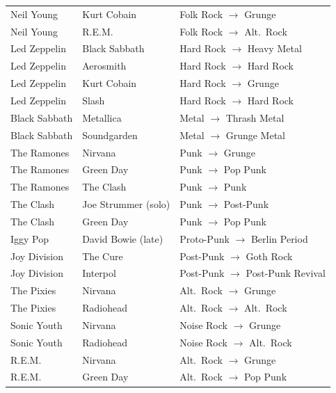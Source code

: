 \documentclass[12pt, a4paper]{article}
\begin{document}
\begin{longtable}{p{4.2cm} p{4.2cm} p{3cm}}
Neil Young          & Kurt Cobain            & Folk Rock $\to$ Grunge \\
Neil Young          & R.E.M.                 & Folk Rock $\to$ Alt.\ Rock \\
Led Zeppelin        & Black Sabbath          & Hard Rock $\to$ Heavy Metal \\
Led Zeppelin        & Aerosmith              & Hard Rock $\to$ Hard Rock \\
Led Zeppelin        & Kurt Cobain            & Hard Rock $\to$ Grunge \\
Led Zeppelin        & Slash                  & Hard Rock $\to$ Hard Rock \\
Black Sabbath       & Metallica              & Metal $\to$ Thrash Metal \\
Black Sabbath       & Soundgarden            & Metal $\to$ Grunge Metal \\
The Ramones         & Nirvana                & Punk $\to$ Grunge \\
The Ramones         & Green Day              & Punk $\to$ Pop Punk \\
The Ramones         & The Clash              & Punk $\to$ Punk \\
The Clash           & Joe Strummer (solo)    & Punk $\to$ Post-Punk \\
The Clash           & Green Day              & Punk $\to$ Pop Punk \\
Iggy Pop            & David Bowie (late)     & Proto-Punk $\to$ Berlin Period \\
Joy Division        & The Cure               & Post-Punk $\to$ Goth Rock \\
Joy Division        & Interpol               & Post-Punk $\to$ Post-Punk Revival \\
The Pixies          & Nirvana                & Alt.\ Rock $\to$ Grunge \\
The Pixies          & Radiohead              & Alt.\ Rock $\to$ Alt.\ Rock \\
Sonic Youth         & Nirvana                & Noise Rock $\to$ Grunge \\
Sonic Youth         & Radiohead              & Noise Rock $\to$ Alt.\ Rock \\
R.E.M.              & Nirvana                & Alt.\ Rock $\to$ Grunge \\
R.E.M.              & Green Day              & Alt.\ Rock $\to$ Pop Punk \\

\end{longtable}
\end{document}
